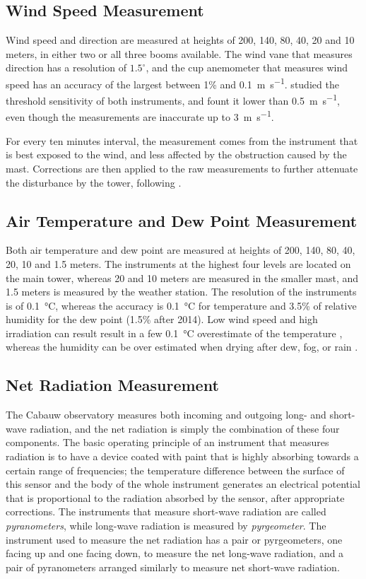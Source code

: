 \documentclass[12pt]{book}
\begin{document}
\subsection{Wind Speed Measurement}
Wind speed and direction are measured at heights of 200, 140, 80, 40, 20 and 10 meters, in either two or all three booms available. The wind vane that measures direction has a resolution of $1.5^\circ$, and the cup anemometer that measures wind speed has an accuracy of the largest between 1\% and \SI{0.1}{\meter\per\second}. \cite{windinstr} studied the threshold sensitivity of both instruments, and fount it lower than \SI{0.5}{\meter\per\second}, even though the measurements are inaccurate up to \SI{3}{\meter\per\second}.

For every ten minutes interval, the measurement comes from the instrument that is best exposed to the wind, and less affected by the obstruction caused by the mast. Corrections are then applied to the raw measurements to further attenuate the disturbance by the tower, following \cite{winddistortion}.

\subsection{Air Temperature and Dew Point Measurement}
Both air temperature and dew point are measured at heights of 200, 140, 80, 40, 20, 10 and 1.5 meters. The instruments at the highest four levels are located on the main tower, whereas 20 and 10 meters are measured in the smaller mast, and 1.5 meters is measured by the weather station. The resolution of the instruments is of \SI{0.1}{\celsius}, whereas the accuracy is \SI{0.1}{\celsius} for temperature and 3.5\% of relative humidity for the dew point (1.5\% after 2014). Low wind speed and high irradiation can result result in a few \SI{0.1}{\celsius} overestimate of the temperature \citep{tempoverestimate}, whereas the humidity can be over estimated when drying after dew, fog, or rain \citep{cabauwinsitu}.

\subsection{Net Radiation Measurement}
The Cabauw observatory measures both incoming and outgoing long- and short-wave radiation, and the net radiation is simply the combination of these four components. The basic operating principle of an instrument that measures radiation is to have a device coated with paint that is highly absorbing towards a certain range of frequencies; the temperature difference between the surface of this sensor and the body of the whole instrument generates an electrical potential that is proportional to the radiation absorbed by the sensor, after appropriate corrections.  The instruments that measure short-wave radiation are called \emph{pyranometers}, while long-wave radiation is measured by \emph{pyrgeometer}.  The instrument used to measure the net radiation has a pair or pyrgeometers, one facing up and one facing down, to measure the net long-wave radiation, and a pair of pyranometers arranged similarly to measure net short-wave radiation.
\end{document}
